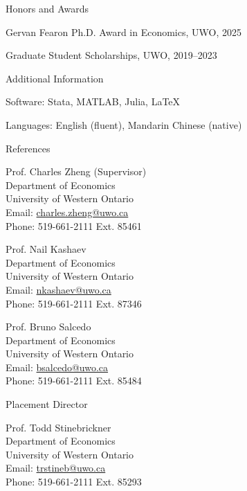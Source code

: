 \documentclass[10pt,letterpaper]{article}
\newcommand{\cvsection}[1]{%
    \par\addvspace{20pt}
    \needspace{4\baselineskip}
    {\fontsize{14.4}{18}\selectfont #1\par}
    \vspace{10pt}
}
\newenvironment{cventries}
{\begin{list}{}{%
    \setlength{\leftmargin}{1.5em}
    \setlength{\rightmargin}{0pt}
    \setlength{\itemsep}{8pt}
    \setlength{\parsep}{0pt}
    \setlength{\topsep}{0pt}
}}
{\end{list}}
\begin{document}
\cvsection{Honors and Awards}

\begin{cventries}

\item Gervan Fearon Ph.D. Award in Economics, UWO, 2025

\item Graduate Student Scholarships, UWO, 2019--2023

\end{cventries}

\cvsection{Additional Information}

\begin{cventries}

\item Software: Stata, MATLAB, Julia, \LaTeX

\item Languages: English (fluent), Mandarin Chinese (native)


\end{cventries}

\cvsection{References}

\begin{minipage}[t]{0.49\textwidth}
Prof. Charles Zheng (Supervisor)\\
Department of Economics\\
University of Western Ontario\\
Email: \href{mailto:charles.zheng@uwo.ca}{charles.zheng@uwo.ca}\\
Phone: 519-661-2111 Ext. 85461
\end{minipage}\hfill
\begin{minipage}[t]{0.49\textwidth}
Prof. Nail Kashaev\\
Department of Economics\\
University of Western Ontario\\
Email: \href{mailto:nkashaev@uwo.ca}{nkashaev@uwo.ca}\\
Phone: 519-661-2111 Ext. 87346
\end{minipage}

\vspace{22pt}

\begin{minipage}[t]{0.49\textwidth}
Prof. Bruno Salcedo\\
Department of Economics\\
University of Western Ontario\\
Email: \href{mailto:bsalcedo@uwo.ca}{bsalcedo@uwo.ca}\\
Phone: 519-661-2111 Ext. 85484
\end{minipage}

\cvsection{Placement Director}

Prof. Todd Stinebrickner\\
Department of Economics\\
University of Western Ontario\\
Email: \href{mailto:trstineb@uwo.ca}{trstineb@uwo.ca}\\
Phone: 519-661-2111 Ext. 85293
\end{document}
